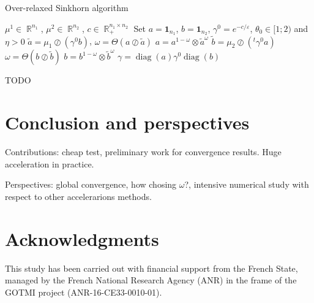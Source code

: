 \documentclass{article} %
\DeclareMathOperator{\IR}{\mathbb{R}}
\DeclareMathOperator{\diag}{diag}
\renewcommand{\epsilon}{\varepsilon}
\theoremstyle{plain}
\theoremstyle{definition}
\theoremstyle{remark}
\begin{document}
\begin{algorithm}
\caption{Over-relaxed Sinkhorn algorithm }
\label{SOR}
\begin{algorithmic}
\REQUIRE $\mu^1\in \IR^{n_1}$, $\mu^2\in \IR^{n_2}$, $c\in \IR^{n_1\times n_2}_+$
\STATE Set $a=\mathbf{1}_{n_1}$, $b=\mathbf{1}_{n_2}$, $\gamma^0=e^{-c/\epsilon}$, $\theta_0\in[1;2)$ and $\eta>0$
\STATE $\tilde a=\mu_1\oslash (\gamma^0 b)$, 
\STATE $\omega=\Theta(a\oslash\tilde a)$
\STATE  $a=a^{1-\omega}\otimes \tilde a^\omega$%
\STATE $\tilde b=\mu_2\oslash (^t\gamma^0  a)$
\STATE $\omega=\Theta(b\oslash\tilde b)$
\STATE  $b=b^{1-\omega}\otimes \tilde b^\omega$%
\ENDWHILE
 \RETURN $\gamma=\diag(a)\gamma^0\diag(b)$
\end{algorithmic}
\end{algorithm}



{\color{red} TODO}


\section{Conclusion and perspectives}
Contributions: 
cheap test, preliminary work for convergence results. Huge acceleration in practice.


Perspectives:
global convergence, how chosing $\omega$?, intensive numerical study with respect to other accelerarions methods\cite{2016arXiv160604133S,2017arXiv170509634A}.





\section*{Acknowledgments}
This study has been carried out with financial support from the French State, managed by the French National Research Agency (ANR) in the frame of the  GOTMI project (ANR-16-CE33-0010-01).




\end{document}
